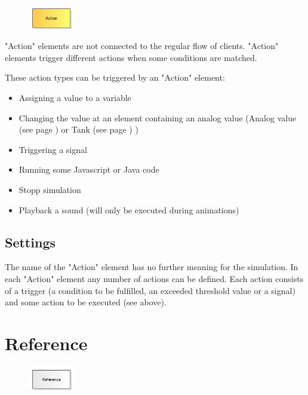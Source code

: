 \begin{figure}
\vspace{-22pt}
\includegraphics[width=2cm]{imageModelElementAction.png}
\vspace{-22pt}
\end{figure}

"Action" elements are not connected to the regular flow of clients.
"Action" elements trigger different actions when some conditions are matched.

These action types can be triggered by an "Action" element:

\begin{itemize}
  \item Assigning a value to a variable 
  \item Changing the value at an element containing an analog value
  (Analog value (see page \pageref{ref:ModelElementAnalogValue}) or Tank (see page \pageref{ref:ModelElementTank}) )
  \item Triggering a signal 
  \item Running some Javascript or Java code 
  \item Stopp simulation 
  \item Playback a sound (will only be executed during animations) 
\end{itemize}

\subsection*{Settings}

The name of the "Action" element has no further meaning for the simulation.
In each "Action" element any number of actions can be defined. Each action
consists of a trigger (a condition to be fulfilled, an exceeded threshold value or a signal)
and some action to be executed (see above).


\section{Reference}
\label{ref:ModelElementReference}

\begin{figure}
\vspace{-22pt}
\includegraphics[width=2cm]{imageModelElementReference.png}
\vspace{-22pt}
\end{figure}


